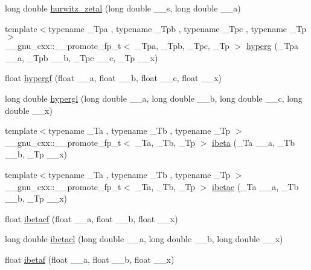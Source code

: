 \begin{DoxyCompactItemize}
long double \hyperlink{group__gnu__math__spec__func_gad8f2cfc7e198755968bae35d46b49d5a}{hurwitz\+\_\+zetal} (long double \+\_\+\+\_\+s, long double \+\_\+\+\_\+a)
\item 
{\footnotesize template$<$typename \+\_\+\+Tpa , typename \+\_\+\+Tpb , typename \+\_\+\+Tpc , typename \+\_\+\+Tp $>$ }\\\+\_\+\+\_\+gnu\+\_\+cxx\+::\+\_\+\+\_\+promote\+\_\+fp\+\_\+t$<$ \+\_\+\+Tpa, \+\_\+\+Tpb, \+\_\+\+Tpc, \+\_\+\+Tp $>$ \hyperlink{group__gnu__math__spec__func_ga40de7f02b2adfe6a883a85698720d7fd}{hyperg} (\+\_\+\+Tpa \+\_\+\+\_\+a, \+\_\+\+Tpb \+\_\+\+\_\+b, \+\_\+\+Tpc \+\_\+\+\_\+c, \+\_\+\+Tp \+\_\+\+\_\+x)
\item 
float \hyperlink{group__gnu__math__spec__func_gac4c81e4ea9cef149fe40291ca10d7e15}{hypergf} (float \+\_\+\+\_\+a, float \+\_\+\+\_\+b, float \+\_\+\+\_\+c, float \+\_\+\+\_\+x)
\item 
long double \hyperlink{group__gnu__math__spec__func_ga9961967087216e97f76283f29e1be152}{hypergl} (long double \+\_\+\+\_\+a, long double \+\_\+\+\_\+b, long double \+\_\+\+\_\+c, long double \+\_\+\+\_\+x)
\item 
{\footnotesize template$<$typename \+\_\+\+Ta , typename \+\_\+\+Tb , typename \+\_\+\+Tp $>$ }\\\+\_\+\+\_\+gnu\+\_\+cxx\+::\+\_\+\+\_\+promote\+\_\+fp\+\_\+t$<$ \+\_\+\+Ta, \+\_\+\+Tb, \+\_\+\+Tp $>$ \hyperlink{group__gnu__math__spec__func_gae9a18423e325171ca0c61b411258fa65}{ibeta} (\+\_\+\+Ta \+\_\+\+\_\+a, \+\_\+\+Tb \+\_\+\+\_\+b, \+\_\+\+Tp \+\_\+\+\_\+x)
\item 
{\footnotesize template$<$typename \+\_\+\+Ta , typename \+\_\+\+Tb , typename \+\_\+\+Tp $>$ }\\\+\_\+\+\_\+gnu\+\_\+cxx\+::\+\_\+\+\_\+promote\+\_\+fp\+\_\+t$<$ \+\_\+\+Ta, \+\_\+\+Tb, \+\_\+\+Tp $>$ \hyperlink{group__gnu__math__spec__func_ga43708e36e01ce6d628ada3aee9be9490}{ibetac} (\+\_\+\+Ta \+\_\+\+\_\+a, \+\_\+\+Tb \+\_\+\+\_\+b, \+\_\+\+Tp \+\_\+\+\_\+x)
\item 
float \hyperlink{group__gnu__math__spec__func_gabd7fa090deead18b167c26b8994b9f53}{ibetacf} (float \+\_\+\+\_\+a, float \+\_\+\+\_\+b, float \+\_\+\+\_\+x)
\item 
long double \hyperlink{group__gnu__math__spec__func_ga48995d537b82e426362a4831ffa1be39}{ibetacl} (long double \+\_\+\+\_\+a, long double \+\_\+\+\_\+b, long double \+\_\+\+\_\+x)
\item 
float \hyperlink{group__gnu__math__spec__func_ga97a5e3afdd990a2d3e199df6856bcf9f}{ibetaf} (float \+\_\+\+\_\+a, float \+\_\+\+\_\+b, float \+\_\+\+\_\+x)

\end{DoxyCompactItemize}
